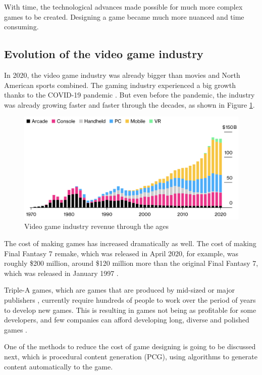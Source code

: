 With time, the technological advances made possible for much more complex games to be created. Designing a game became much more nuanced and time consuming. 

\subsection{Evolution of the video game industry}

In 2020, the video game industry was already bigger than movies and North American sports combined. The gaming industry experienced a big growth thanks to the COVID-19 pandemic \cite{marketwatch:2019}. But even before the pandemic, the industry was already growing faster and faster through the decades, as shown in Figure \ref{fig:growth_graph}.

\begin{figure}[h]
    \caption{Video game industry revenue through the ages}
    \centerline{\includegraphics[width=13cm]{images/introduction/industry_growth.png}}
    \label{fig:growth_graph}
\end{figure}

The cost of making games has increased dramatically as well. The cost of making Final Fantasy 7 remake, which was released in April 2020, for example, was roughly \$200 million, around \$120 million more than the original Final Fantasy 7, which was released in January 1997 \cite{cbr:2021}.

Triple-A games, which are games that are produced by mid-sized or major publishers \cite{steinberg:2007}, currently require hundreds of people to work over the period of years to develop new games. This is resulting in games not being as profitable for some developers, and few companies can afford developing long, diverse and polished games \cite{shaker:2016}.

One of the methods to reduce the cost of game designing is going to be discussed next, which is procedural content generation (PCG), using algorithms to generate content automatically to the game.

